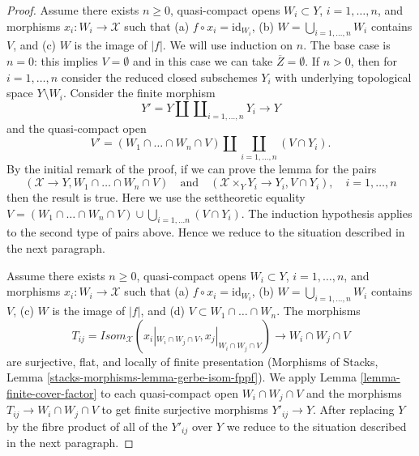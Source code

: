 \documentclass{stacks-project}
\theoremstyle{plain}
\theoremstyle{definition}
\theoremstyle{remark}
\numberwithin{equation}{subsection}
\begin{document}
\begin{proof}
\medskip\noindent
Assume there exists $n \geq 0$, quasi-compact opens
$W_i \subset Y$, $i = 1, \ldots, n$, and
morphisms $x_i : W_i \to \mathcal{X}$ such that
(a) $f \circ x_i = \text{id}_{W_i}$,
(b) $W = \bigcup_{i = 1, \ldots, n} W_i$ contains $V$, and
(c) $W$ is the image of $|f|$.
We will use induction on $n$. The base case is $n = 0$: this
implies $V = \emptyset$ and in this case we can take
$\overline{Z} = \emptyset$.
If $n > 0$, then for $i = 1, \ldots, n$
consider the reduced closed subschemes
$Y_i$ with underlying topological space
$Y \setminus W_i$. Consider the finite morphism
$$
Y' = Y \amalg \coprod\nolimits_{i = 1, \ldots, n} Y_i \longrightarrow Y
$$
and the quasi-compact open
$$
V' = (W_1 \cap \ldots \cap W_n \cap V) \amalg
\coprod_{i = 1, \ldots, n} (V \cap Y_i).
$$
By the initial remark of the proof, if we can prove the lemma for the pairs
$$
(\mathcal{X} \to Y, W_1 \cap \ldots \cap W_n \cap V)
\quad\text{and}\quad
(\mathcal{X} \times_Y Y_i \to Y_i, V \cap Y_i),\quad
i = 1, \ldots, n
$$
then the result is true. Here we use the settheoretic equality
$V = (W_1 \cap \ldots \cap W_n \cap V) \cup
\bigcup\nolimits_{i = 1, \ldots n} (V \cap Y_i)$.
The induction hypothesis applies to the second type of
pairs above. Hence we reduce to the situation described in
the next paragraph.

\medskip\noindent
Assume there exists $n \geq 0$, quasi-compact opens
$W_i \subset Y$, $i = 1, \ldots, n$, and
morphisms $x_i : W_i \to \mathcal{X}$ such that
(a) $f \circ x_i = \text{id}_{W_i}$,
(b) $W = \bigcup_{i = 1, \ldots, n} W_i$ contains $V$,
(c) $W$ is the image of $|f|$, and
(d) $V \subset W_1 \cap \ldots \cap W_n$.
The morphisms
$$
T_{ij} = \mathit{Isom}_\mathcal{X}(x_i|_{W_i \cap W_j \cap V},
x_j|_{W_i \cap W_j \cap V}) \longrightarrow W_i \cap W_j \cap V
$$
are surjective, flat, and locally of finite presentation
(Morphisms of Stacks, Lemma \ref{stacks-morphisms-lemma-gerbe-isom-fppf}).
We apply Lemma \ref{lemma-finite-cover-factor}
to each quasi-compact open $W_i \cap W_j \cap V$ and the morphisms
$T_{ij} \to W_i \cap W_j \cap V$ to get finite surjective morphisms
$Y'_{ij} \to Y$. After replacing $Y$ by the fibre product of all
of the $Y'_{ij}$ over $Y$ we reduce to the situation described
in the next paragraph.


\end{proof}
\end{document}
